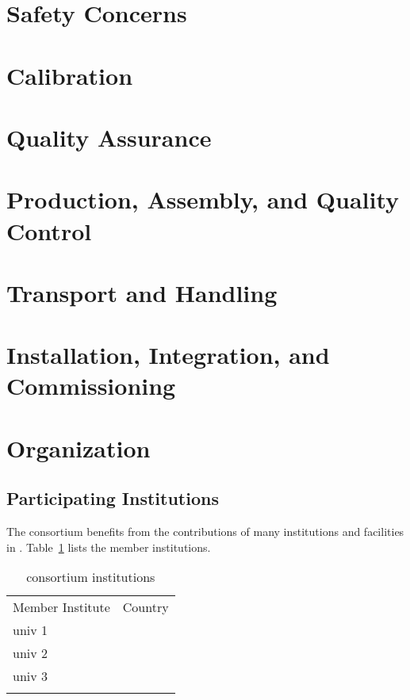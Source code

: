 \section{Safety Concerns}
\label{sec:tms-safety}


\section{Calibration}
\label{sec:tms-calib}

\section{Quality Assurance}
\label{sec:tms-qa}

\section{Production, Assembly, and Quality Control}
\label{sec:tms-qc}

\section{Transport and Handling}
\label{sec:tms-transport}

\section{Installation, Integration, and Commissioning}
\label{sec:tms-iic}

\section{Organization}
\label{sec:tms-org}

\subsection{Participating Institutions}
\label{sec:fdsp-org-inst}

The  consortium benefits from the contributions of many institutions and facilities in .  Table~\ref{tab:tms-institutes}
lists the member institutions. 

\begin{longtable}
{ll}
\caption{ consortium institutions}\\ \colhline
\rowcolor{dunetablecolor} Member Institute  &  Country       \\  \toprowrule
univ 1 &  \\ \colhline
univ 2 &  \\ \colhline
univ 3 &  \\ 
\label{tab:tms-institutes}
\end{longtable}












